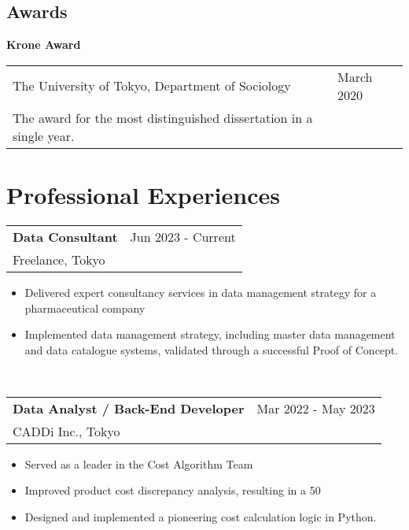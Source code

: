 \documentclass[11pt, a4paper]{article}
\begin{document}
\subsection*{Awards}
\textbf{Krone Award} \\
\begin{tabular}{@{}p{}p{}}
The University of Tokyo, Department of Sociology & \hfill March 2020 \\
The award for the most distinguished dissertation in a single year.
\end{tabular}

\section*{Professional Experiences}
\begin{tabular}{@{}p{}p{}}
\textbf{Data Consultant} & \hfill Jun 2023 - Current \\
Freelance, Tokyo \\
\end{tabular}
\begin{itemize}[noitemsep, topsep=0pt] %
    \item Delivered expert consultancy services in data management strategy for a pharmaceutical company
    \item Implemented data management strategy, including master data management and data catalogue systems, validated through a successful Proof of Concept.
\end{itemize} \\
\begin{tabular}{@{}p{}p{}}
\textbf{Data Analyst / Back-End Developer} & \hfill Mar 2022 - May 2023 \\
CADDi Inc., Tokyo \\
\end{tabular}
\begin{itemize}[noitemsep, topsep=0pt] %
    \item Served as a leader in the Cost Algorithm Team
    \item Improved product cost discrepancy analysis, resulting in a 50%
    \item Designed and implemented a pioneering cost calculation logic in Python.
\end{itemize} \\
\end{document}
